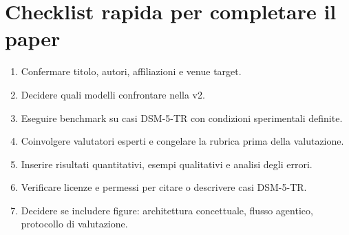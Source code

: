 \documentclass[11pt,a4paper]{article}
\begin{document}
\section*{Checklist rapida per completare il paper}
\begin{enumerate}
  \item Confermare titolo, autori, affiliazioni e venue target.
  \item Decidere quali modelli confrontare nella v2.
  \item Eseguire benchmark su casi DSM-5-TR con condizioni sperimentali definite.
  \item Coinvolgere valutatori esperti e congelare la rubrica prima della valutazione.
  \item Inserire risultati quantitativi, esempi qualitativi e analisi degli errori.
  \item Verificare licenze e permessi per citare o descrivere casi DSM-5-TR.
  \item Decidere se includere figure: architettura concettuale, flusso agentico, protocollo di valutazione.
\end{enumerate}



\end{document}
